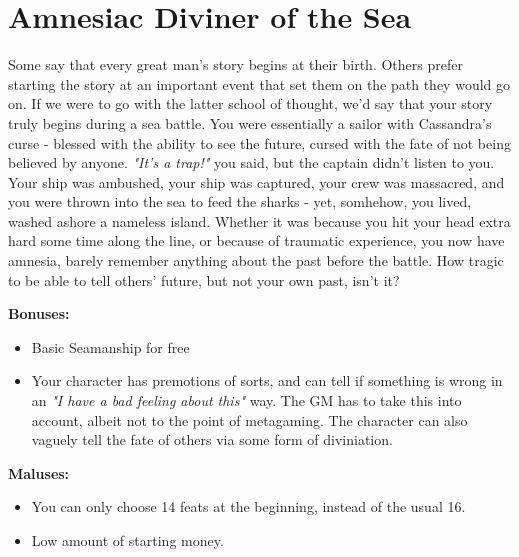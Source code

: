 \section{Amnesiac Diviner of the Sea}
Some say that every great man's story begins at their birth. Others prefer starting the story at an important event that set them on the path they would go on. If we were to go with the latter school of thought, we'd say that your story truly begins during a sea battle. You were essentially a sailor with Cassandra's curse - blessed with the ability to see the future, cursed with the fate of not being believed by anyone. \textit{"It's a trap!"} you said, but the captain didn't listen to you. Your ship was ambushed, your ship was captured, your crew was massacred, and you were thrown into the sea to feed the sharks - yet, somhehow, you lived, washed ashore a nameless island. Whether it was because you hit your head extra hard some time along the line, or because of traumatic experience, you now have amnesia, barely remember anything about the past before the battle. How tragic to be able to tell others' future, but not your own past, isn't it?


\textbf{Bonuses:}
\begin{itemize}
	\item Basic Seamanship for free
	\item Your character has premotions of sorts, and can tell if something is wrong in an \textit{"I have a bad feeling about this"} way. The GM has to take this into account, albeit not to the point of metagaming. The character can also vaguely tell the fate of others via some form of diviniation.
\end{itemize}
\textbf{Maluses:}
\begin{itemize}
	\item You can only choose 14 feats at the beginning, instead of the usual 16.
	\item Low amount of starting money.
\end{itemize}

